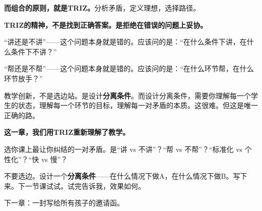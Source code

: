\textbf{而组合的原则，就是TRIZ。}分析矛盾，定义理想，选择路径。

\begin{shiyu-note}
\label{note:chap13}

\textbf{TRIZ的精神，不是找到正确答案。是拒绝在错误的问题上妥协。}

``讲还是不讲''——这个问题本身就是错的。应该问的是：``在什么条件下讲，在什么条件下不讲？''

``帮还是不帮''——这个问题本身就是错的。应该问的是：``在什么环节帮，在什么环节放手？''

教学创新，不是选边站。是设计\textbf{分离条件}。而设计分离条件，需要你理解每一个学生的状态，理解每一个环节的目标，理解每一对矛盾的本质。这很难。但这是唯一正确的路。
\end{shiyu-note}

\vspace{1cm}

\begin{decision-point}
\label{decision:chap13}

\noindent\textbf{这一章，我们用TRIZ重新理解了教学。}

\vspace{0.3cm}

\noindent 选你课上最让你纠结的一对矛盾。是``讲 vs 不讲''？``帮 vs 不帮''？``标准化 vs 个性化''？``快 vs 慢''？

\noindent 不要选边。设计一个\textbf{分离条件}——在什么情况下做A，在什么情况下做B。写下来。下一节课试试。试完告诉我，效果如何。
\end{decision-point}

\vspace{0.5cm}

\begin{flushright}
{\small\color{muted} 下一章：一封写给所有孩子的邀请函。}
\end{flushright}